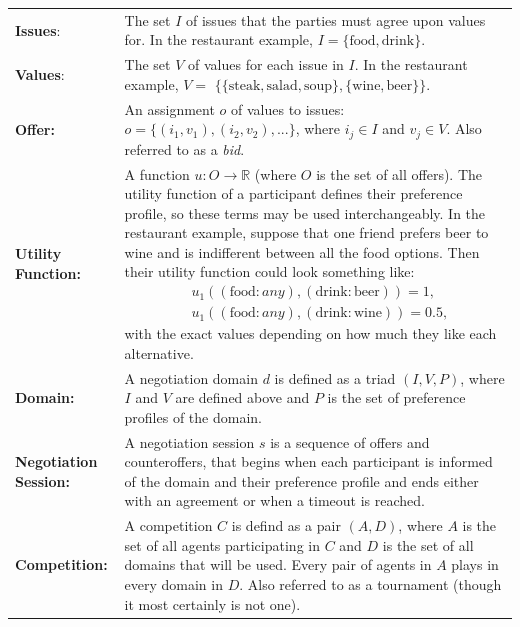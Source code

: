 \documentclass[12pt]{article}
\numberwithin{equation}{section}
\begin{document}
				\renewcommand{\arraystretch}{1.5} %
				\begin{longtable}{l p{290pt}}

						\textbf{Issues}: & The set $I$ of issues that the parties must agree upon values for. In the restaurant example, $I=\{\text{food}, \text{drink}\}$. \\

						\textbf{Values}: & The set $V$ of values for each issue in $I$. In the restaurant example, $V=$ $\{\{\text{steak}, \text{salad}, \text{soup}\}, \{\text{wine}, \text{beer}\}\}$.\\

						\textbf{Offer:} & An assignment $o$ of values to issues: $o=\{(i_{1}, v_{1}), (i_{2}, v_{2}), ...\}$, where $i_{j} \in I$ and $v_{j} \in V$. Also referred to as a \emph{bid}. \\

						\textbf{Utility Function:} & A function $u: O \to \mathbb{R}$ (where $O$ is the set of all offers). The utility function of a participant defines their preference profile, so these terms may be used interchangeably. In the restaurant example, suppose that one friend prefers beer to wine and is indifferent between all the food options. Then their utility function could look something like:
						\begin{equation*}
							\begin{aligned}
								& u_{1}((\text{food}: \textit{any}), (\text{drink}: \text{beer}))=1, \\
								& u_{1}((\text{food}: \textit{any}), (\text{drink}: \text{wine}))=0.5,
							\end{aligned}
						\end{equation*}
						with the exact values depending on how much they like each alternative.\\

						\textbf{Domain:} & A negotiation domain $d$ is defined as a triad $(I, V, P)$, where $I$ and $V$ are defined above and $P$ is the set of preference profiles of the domain\protect\footnotemark.\\
	
						\textbf{Negotiation Session:} & A negotiation session $s$ is a sequence of offers and counteroffers, that begins when each participant is informed of the domain and their preference profile and ends either with an agreement or when a timeout is reached. \\

						\textbf{Competition:} & A competition $C$ is defind as a pair $(A, D)$, where $A$ is the set of all agents participating in $C$ and $D$ is the set of all domains that will be used. Every pair of agents in $A$ plays in every domain in $D$. Also referred to as a tournament (though it most certainly is not one).\\	%

				\end{longtable}
\end{document}
